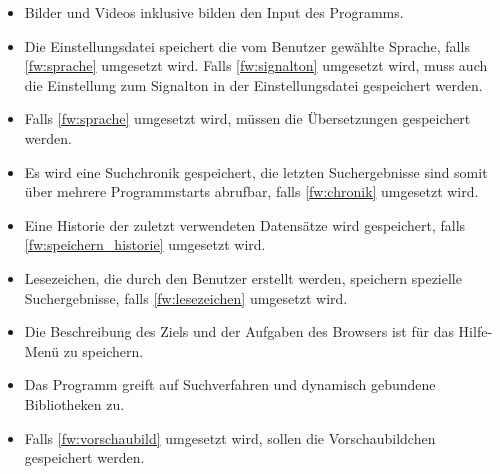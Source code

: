 \begin{itemize}
	\item Bilder und Videos inklusive  bilden den Input des Programms.
	\item Die Einstellungsdatei speichert die vom Benutzer gewählte Sprache, falls \ref{fw:sprache} umgesetzt wird. Falls \ref{fw:signalton} umgesetzt wird, muss auch die Einstellung zum Signalton in der Einstellungsdatei gespeichert werden.
	\item Falls \ref{fw:sprache} umgesetzt wird, müssen die Übersetzungen gespeichert werden.
	\item Es wird eine \gls{Suchchronik} gespeichert, die letzten Suchergebnisse sind somit über mehrere Programmstarts abrufbar, falls \ref{fw:chronik} umgesetzt wird. 
	\item Eine Historie der zuletzt verwendeten Datensätze wird gespeichert, falls \ref{fw:speichern_historie} umgesetzt wird.
	\item \gls{Lesezeichen}, die durch den Benutzer erstellt werden, speichern spezielle Suchergebnisse, falls \ref{fw:lesezeichen} umgesetzt wird.
	\item Die Beschreibung des Ziels und der Aufgaben des Browsers ist für das Hilfe-Menü zu speichern.
	\item Das Programm greift auf \gls{Suchverfahren} und dynamisch gebundene Bibliotheken zu.
	\item Falls \ref{fw:vorschaubild} umgesetzt wird, sollen die Vorschaubildchen gespeichert werden.
\end{itemize}
\pagebreak
